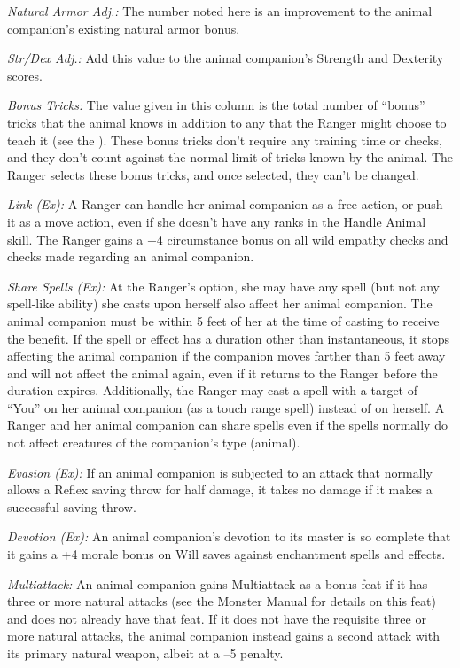\textit{Natural Armor Adj.:} The number noted here is an improvement to the animal companion’s existing natural armor bonus.

\textit{Str/Dex Adj.:} Add this value to the animal companion’s Strength and Dexterity scores.

\textit{Bonus Tricks:} The value given in this column is the total number of “bonus” tricks that the animal knows in addition to any that the Ranger might choose to teach it (see the ). These bonus tricks don’t require any training time or  checks, and they don’t count against the normal limit of tricks known by the animal. The Ranger selects these bonus tricks, and once selected, they can’t be changed.

\textit{Link (Ex):} A Ranger can handle her animal companion as a free action, or push it as a move action, even if she doesn’t have any ranks in the Handle Animal skill. The Ranger gains a +4 circumstance bonus on all wild empathy checks and  checks made regarding an animal companion.

\textit{Share Spells (Ex):} At the Ranger’s option, she may have any spell (but not any spell-like ability) she casts upon herself also affect her animal companion. The animal companion must be within 5 feet of her at the time of casting to receive the benefit. If the spell or effect has a duration other than instantaneous, it stops affecting the animal companion if the companion moves farther than 5 feet away and will not affect the animal again, even if it returns to the Ranger before the duration expires. Additionally, the Ranger may cast a spell with a target of “You” on her animal companion (as a touch range spell) instead of on herself. A Ranger and her animal companion can share spells even if the spells normally do not affect creatures of the companion’s type (animal).

\textit{Evasion (Ex):} If an animal companion is subjected to an attack that normally allows a Reflex saving throw for half damage, it takes no damage if it makes a successful saving throw.

\textit{Devotion (Ex):} An animal companion’s devotion to its master is so complete that it gains a +4 morale bonus on Will saves against enchantment spells and effects.

\textit{Multiattack:} An animal companion gains Multiattack as a bonus feat if it has three or more natural attacks (see the Monster Manual for details on this feat) and does not already have that feat. If it does not have the requisite three or more natural attacks, the animal companion instead gains a second attack with its primary natural weapon, albeit at a –5 penalty.

\pagebreak
